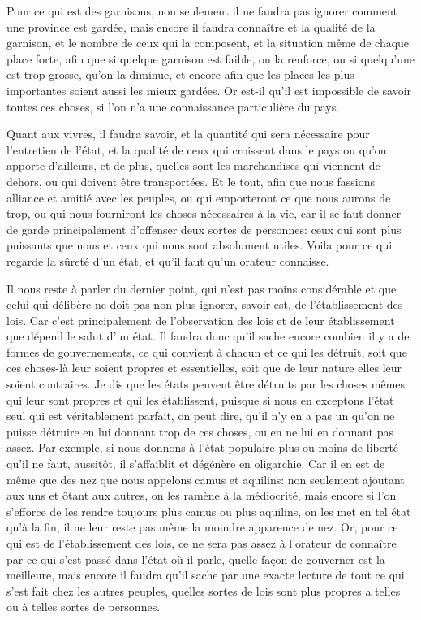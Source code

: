 Pour ce qui est des garnisons, non seulement il ne faudra pas ignorer comment une province est gardée, mais encore il faudra connaître
et la qualité de la garnison, et le nombre de ceux qui la composent, et la situation même de chaque place forte, afin que si quelque
garnison est faible, on la renforce, ou si quelqu'une est trop grosse, qu'on la diminue, et encore afin que les places les plus
importantes soient aussi les mieux gardées. Or est-il qu'il est impossible de savoir toutes ces choses, si l'on n'a une connaissance
particulière du pays.

Quant aux vivres, il faudra savoir, et la quantité qui sera nécessaire pour l'entretien de l'état, et la qualité de ceux qui croissent
dans le pays ou qu'on apporte d'ailleurs, et de plus, quelles sont les marchandises qui viennent de dehors, ou qui doivent être transportées.
Et le tout, afin que nous fassions alliance et amitié avec les peuples, ou qui emporteront ce que nous aurons de trop, ou qui nous fourniront
les choses nécessaires à la vie, car il se faut donner de garde principalement d'offenser deux sortes de personnes: ceux qui sont plus
puissants que nous et ceux qui nous sont absolument utiles. Voila pour ce qui regarde la sûreté d'un état, et qu'il faut qu'un orateur connaisse.

\bigbreak

Il nous reste à parler du dernier point, qui n'est pas moins considérable et que celui qui délibère ne doit pas non plus ignorer, savoir est,
de l'établissement des lois. Car c'est principalement de l'observation des lois et de leur établissement que dépend le salut d'un état. Il
faudra donc qu'il sache encore combien il y a de formes de gouvernements, ce qui convient à chacun et ce qui les détruit, soit que ces choses-là
leur soient propres et essentielles, soit que de leur nature elles leur soient contraires. Je dis que les états peuvent être détruits par les
choses mêmes qui leur sont propres et qui les établissent, puisque si nous en exceptons l'état seul qui est véritablement parfait, on peut dire,
qu'il n'y en a pas un qu'on ne puisse détruire en lui donnant trop de ces choses, ou en ne lui en donnant pas assez. Par exemple, si nous
donnons à l'état populaire plus ou moins de liberté qu'il ne faut, aussitôt, il s'affaiblit et dégénère en oligarchie. Car il en est de même que
des nez que nous appelons camus et aquilins: non seulement ajoutant aux uns et ôtant aux autres, on les ramène à la médiocrité, mais encore si
l'on s'efforce de les rendre toujours plus camus ou plus aquilins, on les met en tel état qu'à la fin, il ne leur reste pas même la moindre
apparence de nez. Or, pour ce qui est de l'établissement des lois, ce ne sera pas assez à l'orateur de connaître par ce qui s'est passé dans l'état
où il parle, quelle façon de gouverner est la meilleure, mais encore il faudra qu'il sache par une exacte lecture de tout ce qui s'est fait chez
les autres peuples, quelles sortes de lois sont plus propres a telles ou à telles sortes de personnes.

